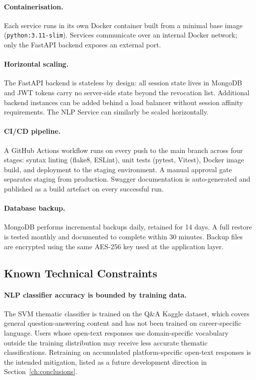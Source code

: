 \paragraph{Containerisation.}
Each service runs in its own Docker container built from a minimal base image
(\texttt{python:3.11-slim}). Services communicate over an internal Docker
network; only the FastAPI backend exposes an external port.

\paragraph{Horizontal scaling.}
The FastAPI backend is stateless by design: all session state lives in MongoDB
and JWT tokens carry no server-side state beyond the revocation list.
Additional backend instances can be added behind a load balancer without
session affinity requirements. The NLP Service can similarly be scaled
horizontally.

\paragraph{CI/CD pipeline.}
A GitHub Actions workflow runs on every push to the main branch across four
stages: syntax linting (flake8, ESLint), unit tests (pytest, Vitest), Docker
image build, and deployment to the staging environment. A manual approval gate
separates staging from production. Swagger documentation is auto-generated and
published as a build artefact on every successful run.

\paragraph{Database backup.}
MongoDB performs incremental backups daily, retained for 14 days. A full
restore is tested monthly and documented to complete within 30 minutes. Backup
files are encrypted using the same AES-256 key used at the application layer.

\subsection{Known Technical Constraints}

\paragraph{NLP classifier accuracy is bounded by training data.}
The SVM thematic classifier is trained on the Q\&A Kaggle dataset, which
covers general question-answering content and has not been trained on
career-specific language. Users whose open-text responses use domain-specific
vocabulary outside the training distribution may receive less accurate thematic
classifications. Retraining on accumulated platform-specific open-text
responses is the intended mitigation, listed as a future development direction
in Section~\ref{ch:conclusions}.

